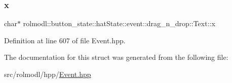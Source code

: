 \subsubsection{\texorpdfstring{x}{x}}
{\footnotesize\ttfamily char$\ast$ rolmodl\+::button\+\_\+state\+::hat\+State\+::event\+::drag\+\_\+n\+\_\+drop\+::\+Text\+::x}



Definition at line 607 of file Event.\+hpp.



The documentation for this struct was generated from the following file\+:\begin{DoxyCompactItemize}
\item 
src/rolmodl/hpp/\mbox{\hyperlink{_event_8hpp}{Event.\+hpp}}\end{DoxyCompactItemize}
